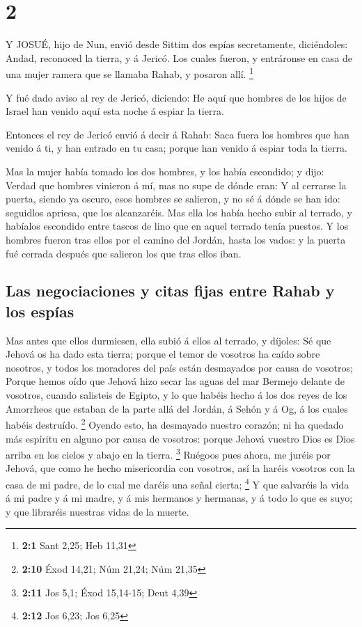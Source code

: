 \hypertarget{section-1}{%
\section{2}\label{section-1}}

 Y JOSUÉ, hijo de Nun, envió desde Sittim dos espías
secretamente, diciéndoles: Andad, reconoced la tierra, y á Jericó. Los
cuales fueron, y entráronse en casa de una mujer ramera que se llamaba
Rahab, y posaron allí. \footnote{\textbf{2:1} Sant 2,25; Heb 11,31}

 Y fué dado aviso al rey de Jericó, diciendo: He aquí que
hombres de los hijos de Israel han venido aquí esta noche á espiar la
tierra.

 Entonces el rey de Jericó envió á decir á Rahab: Saca fuera
los hombres que han venido á ti, y han entrado en tu casa; porque han
venido á espiar toda la tierra.

 Mas la mujer había tomado los dos hombres, y los había
escondido; y dijo: Verdad que hombres vinieron á mí, mas no supe de
dónde eran:  Y al cerrarse la puerta, siendo ya oscuro, esos
hombres se salieron, y no sé á dónde se han ido: seguidlos apriesa, que
los alcanzaréis.  Mas ella los había hecho subir al terrado,
y habíalos escondido entre tascos de lino que en aquel terrado tenía
puestos.  Y los hombres fueron tras ellos por el camino del
Jordán, hasta los vados: y la puerta fué cerrada después que salieron
los que tras ellos iban.

\hypertarget{las-negociaciones-y-citas-fijas-entre-rahab-y-los-espuxedas}{%
\subsection{Las negociaciones y citas fijas entre Rahab y los
espías}\label{las-negociaciones-y-citas-fijas-entre-rahab-y-los-espuxedas}}

 Mas antes que ellos durmiesen, ella subió á ellos al
terrado, y díjoles:  Sé que Jehová os ha dado esta tierra;
porque el temor de vosotros ha caído sobre nosotros, y todos los
moradores del país están desmayados por causa de vosotros; 
Porque hemos oído que Jehová hizo secar las aguas del mar Bermejo
delante de vosotros, cuando salisteis de Egipto, y lo que habéis hecho á
los dos reyes de los Amorrheos que estaban de la parte allá del Jordán,
á Sehón y á Og, á los cuales habéis destruído. \footnote{\textbf{2:10}
  Éxod 14,21; Núm 21,24; Núm 21,35}  Oyendo esto, ha
desmayado nuestro corazón; ni ha quedado más espíritu en alguno por
causa de vosotros: porque Jehová vuestro Dios es Dios arriba en los
cielos y abajo en la tierra. \footnote{\textbf{2:11} Jos 5,1; Éxod
  15,14-15; Deut 4,39}  Ruégoos pues ahora, me juréis por
Jehová, que como he hecho misericordia con vosotros, así la haréis
vosotros con la casa de mi padre, de lo cual me daréis una señal cierta;
\footnote{\textbf{2:12} Jos 6,23; Jos 6,25}  Y que
salvaréis la vida á mi padre y á mi madre, y á mis hermanos y hermanas,
y á todo lo que es suyo; y que libraréis nuestras vidas de la muerte.

